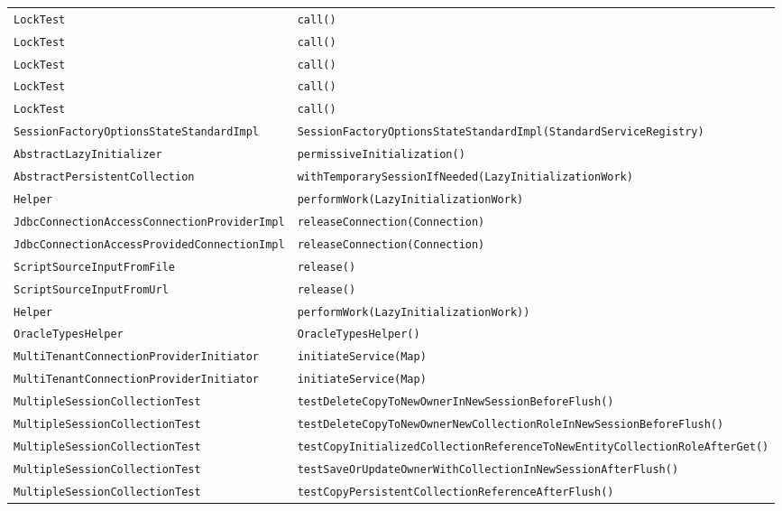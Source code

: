 \begin{center}
\begin{longtable}{ll}
\lstinline/LockTest/&{\lstinline/call()/}\\
\lstinline/LockTest/&{\lstinline/call()/}\\
\lstinline/LockTest/&{\lstinline/call()/}\\
\lstinline/LockTest/&{\lstinline/call()/}\\
\lstinline/LockTest/&{\lstinline/call()/}\\
\lstinline/SessionFactoryOptionsStateStandardImpl/&{\lstinline/SessionFactoryOptionsStateStandardImpl(StandardServiceRegistry)/}\\
\lstinline/AbstractLazyInitializer/&{\lstinline/permissiveInitialization()/}\\
\lstinline/AbstractPersistentCollection/&{\lstinline/withTemporarySessionIfNeeded(LazyInitializationWork)/}\\
\lstinline/Helper/&{\lstinline/performWork(LazyInitializationWork)/}\\
\lstinline/JdbcConnectionAccessConnectionProviderImpl/&{\lstinline/releaseConnection(Connection)/}\\
\lstinline/JdbcConnectionAccessProvidedConnectionImpl/&{\lstinline/releaseConnection(Connection)/}\\
\lstinline/ScriptSourceInputFromFile/&{\lstinline/release()/}\\
\lstinline/ScriptSourceInputFromUrl/&{\lstinline/release()/}\\
\lstinline/Helper/&{\lstinline/performWork(LazyInitializationWork))/}\\
\lstinline/OracleTypesHelper/&{\lstinline/OracleTypesHelper()/}\\
\lstinline/MultiTenantConnectionProviderInitiator/&{\lstinline/initiateService(Map)/}\\
\lstinline/MultiTenantConnectionProviderInitiator/&{\lstinline/initiateService(Map)/}\\
\lstinline/MultipleSessionCollectionTest/&{\lstinline/testDeleteCopyToNewOwnerInNewSessionBeforeFlush()/}\\
\lstinline/MultipleSessionCollectionTest/&{\lstinline/testDeleteCopyToNewOwnerNewCollectionRoleInNewSessionBeforeFlush()/}\\
\lstinline/MultipleSessionCollectionTest/&{\lstinline/testCopyInitializedCollectionReferenceToNewEntityCollectionRoleAfterGet()/}\\
\lstinline/MultipleSessionCollectionTest/&{\lstinline/testSaveOrUpdateOwnerWithCollectionInNewSessionAfterFlush()/}\\
\lstinline/MultipleSessionCollectionTest/&{\lstinline/testCopyPersistentCollectionReferenceAfterFlush()/}\\

\end{longtable}
\end{center}
